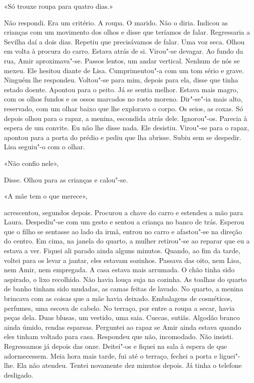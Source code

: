 «Só trouxe roupa para quatro dias.»

Não respondi. Era um critério. A roupa. O marido. Não o diria. Indicou
as crianças com um movimento dos olhos e disse que teríamos de falar.
Regressaria a Sevilha daí a dois dias. Repetiu que precisávamos de
falar. Uma voz seca. Olhou em volta à procura do carro. Estava atrás de
si. Virou"-se devagar. Ao fundo da rua, Amir aproximava"-se. Passos
lentos, um andar vertical. Nenhum de nós se mexeu. Ele hesitou diante de
Lisa. Cumprimentou"-a com um tom sério e grave. Ninguém lhe respondeu.
Voltou"-se para mim, depois para ela, disse que tinha estado doente.
Apontou para o peito. Já se sentia melhor. Estava mais magro, com os
olhos fundos e os ossos marcados no rosto moreno. Dir"-se"-ia mais alto,
reservado, com um olhar baixo que lhe explorava o corpo. Os seios, as
coxas. Só depois olhou para o rapaz, a menina, escondida atrás dele.
Ignorou"-os. Parecia à espera de um convite. Eu não lhe disse nada. Ele
desistiu. Virou"-se para o rapaz, apontou para a porta do prédio e pediu
que lha abrisse. Subiu sem se despedir. Lisa seguiu"-o com o olhar.

«Não confio nele»,

Disse. Olhou para as crianças e calou"-se.

«A mãe tem o que merece»,

acrescentou, segundos depois. Procurou a chave do carro e estendeu a mão
para Laura. Despediu"-se com um gesto e sentou a criança no banco de
trás. Esperou que o filho se sentasse ao lado da irmã, entrou no carro e
afastou"-se na direção do centro. Em cima, na janela do quarto, a
mulher retirou"-se ao reparar que eu a estava a ver. Fiquei ali parado
ainda alguns minutos. Quando, ao fim da tarde, voltei para os levar a
jantar, eles estavam sozinhos. Passava das oito, nem Lisa, nem Amir, nem
empregada. A casa estava mais arrumada. O chão tinha sido aspirado, o
lixo recolhido. Não havia louça suja na cozinha. As toalhas do quarto de
banho tinham sido mudadas, as camas feitas de lavado. No quarto, a
menina brincava com as coisas que a mãe havia deixado. Embalagens de
cosméticos, perfumes, uma escova de cabelo. No terraço, por entre a
roupa a secar, havia peças dela. Duas blusas, um vestido, uma saia.
Cuecas, sutiãs. Algodão branco ainda úmido, rendas esparsas. Perguntei
ao rapaz se Amir ainda estava quando eles tinham voltado para casa.
Respondeu que não, incomodado. Não insisti. Regressamos já depois das
onze. Deitei"-os e fiquei na sala à espera de que adormecessem. Meia
hora mais tarde, fui até o terraço, fechei a porta e liguei"-lhe. Ela
não atendeu. Tentei novamente dez minutos depois. Já tinha o telefone
desligado.

